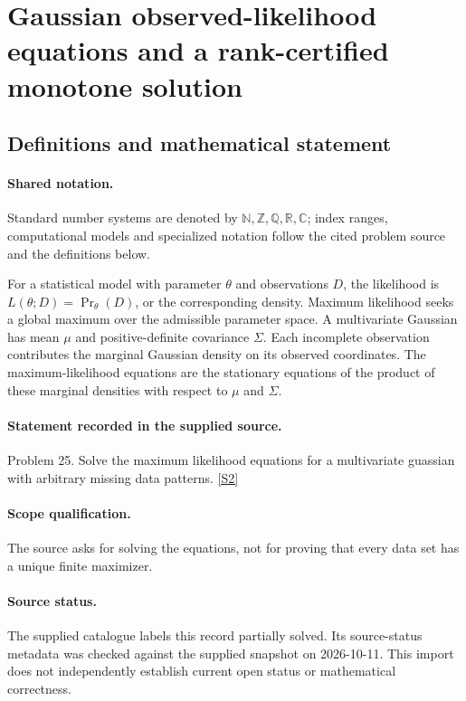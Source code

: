 \documentclass[11pt]{article}
\newcommand{\sref}[2]{\hyperlink{source:#1:#2}{[S#2]}}
\begin{document}
\section{Gaussian observed-likelihood equations and a rank-certified monotone solution}\label{statement}

\subsection{Definitions and mathematical statement}

\paragraph{Shared notation.}Standard number systems are denoted by $\mathbb N,\mathbb Z,\mathbb Q,\mathbb R,\mathbb C$; index ranges, computational models and specialized notation follow the cited problem source and the definitions below.


For a statistical model with parameter $\theta$ and observations $D$, the likelihood is $L(\theta;D)=\Pr_\theta(D)$, or the corresponding density. Maximum likelihood seeks a global maximum over the admissible parameter space. A multivariate Gaussian has mean $\mu$ and positive-definite covariance $\Sigma$. Each incomplete observation contributes the marginal Gaussian density on its observed coordinates. The maximum-likelihood equations are the stationary equations of the product of these marginal densities with respect to $\mu$ and $\Sigma$.
\paragraph{Statement recorded in the supplied source.}
Problem 25. Solve the maximum likelihood equations for a multivariate guassian with arbitrary missing data patterns. \sref{statement}{2}
\paragraph{Scope qualification.}
The source asks for solving the equations, not for proving that every data set has a unique finite maximizer.
\paragraph{Source status.}
The supplied catalogue labels this record partially solved. Its source-status metadata was checked against the supplied snapshot on 2026-10-11. This import does not independently establish current open status or mathematical correctness.
\end{document}

